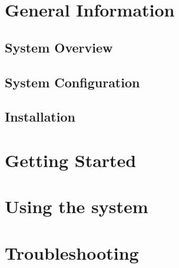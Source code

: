 \documentclass[hidelinks, 12pt, oneside]{article}
\begin{document}
\tableofcontents
\newpage
\section{General Information}
\subsection{System Overview}
	

\subsection{System Configuration}
	
\pagebreak
\subsection{Installation}
	
	
\newpage
\section{Getting Started}
	
	
\newpage
\section{Using the system}
	
	
\newpage
\section{Troubleshooting}
	
	
\end{document}
